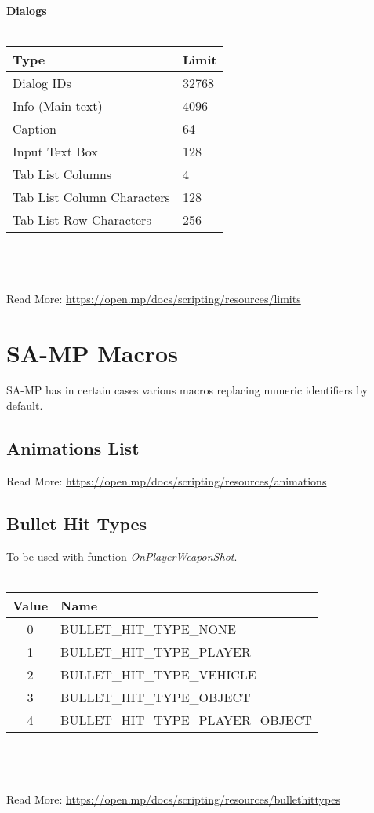 \documentclass{article}
\begin{document}
\\
\\
\\\textbf{Dialogs}
\\
\\
\begin{tabular}{ |l|l| } 
\hline
Type & Limit \\
\hline
Dialog IDs & 32768 \\
Info (Main text) & 4096 \\
Caption & 64 \\
Input Text Box & 128 \\
Tab List Columns & 4 \\
Tab List Column Characters & 128 \\
Tab List Row Characters & 256 \\
\hline
\end{tabular}
\\
\\
\\Read More: \url{https://open.mp/docs/scripting/resources/limits}


\newpage
\section{SA-MP Macros}
SA-MP has in certain cases various macros replacing numeric identifiers by default.
\subsection{Animations List}
Read More: \url{https://open.mp/docs/scripting/resources/animations}


\subsection{Bullet Hit Types}
To be used with function \textit{OnPlayerWeaponShot}.
\\
\\
\begin{tabular}{ |c|l| } 
\hline
Value & Name \\
\hline
0 & BULLET\_HIT\_TYPE\_NONE \\
1 & BULLET\_HIT\_TYPE\_PLAYER \\
2 & BULLET\_HIT\_TYPE\_VEHICLE \\
3 & BULLET\_HIT\_TYPE\_OBJECT \\
4 & BULLET\_HIT\_TYPE\_PLAYER\_OBJECT \\
\hline
\end{tabular}
\\\\
\\Read More: \url{https://open.mp/docs/scripting/resources/bullethittypes}
\end{document}
